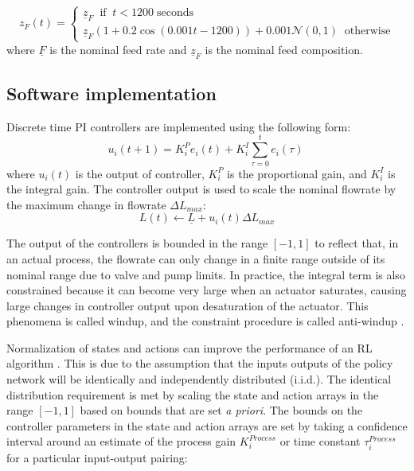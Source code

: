 \begin{equation}
	z_F(t) = 
	\begin{cases}
		\underline z_F \;\; \text{if}\;\; t < 1200 \;\text{seconds} \\
		\underline z_F(1+ 0.2\cos(0.001t-1200))+0.001 \mathcal{N}(0,1) \;\; \text{otherwise}
	\end{cases}
\end{equation}
where $\underline F$ is the nominal feed rate and $\underline z_F$ is the nominal feed composition.

\subsection{Software implementation}
Discrete time PI controllers are implemented using the following form:
	\begin{equation}
	u_i(t+1) = K_i^P e_i(t) +K_i^I \sum_{\tau=0}^{t}{e_i(\tau)}\ 
	\end{equation}
where $u_i(t)$ is the output of controller, $K_i^P$ is the proportional gain, and $K_i^I$ is the integral gain. The controller output is used to scale the nominal flowrate by the maximum change in flowrate $\Delta L_{max}$:
\begin{equation}
	L(t) \leftarrow \underline L + u_i(t)\Delta L_{max}
\end{equation}

The output of the controllers is bounded in the range $[-1,1]$ to reflect that, in an actual process, the flowrate can only change in a finite range outside of its nominal range due to valve and pump limits. In practice, the integral term is also constrained because it can become very large when an actuator saturates, causing large changes in controller output upon desaturation of the actuator. This phenomena is called windup, and the constraint procedure is called anti-windup \cite{Riggs2006}.

Normalization of states and actions can improve the performance of an RL algorithm \cite{Engstrom2020}. This is due to the assumption that the inputs outputs of the policy network will be identically and independently distributed (i.i.d.).  The identical distribution requirement is met by scaling the state and action arrays in the range $[-1,1]$ based on bounds that are set \emph{a priori}. The bounds on the controller parameters in the state and action arrays are set by taking a confidence interval around an estimate of the process gain $K_i^{Process}$ or time constant $\tau_i^{Process}$ for a particular input-output pairing\cite{Cai2009, Astrom2006}:

